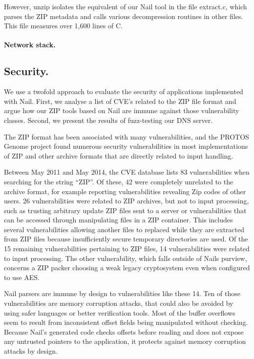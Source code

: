 However, unzip isolates the equivalent of our Nail tool in the file extract.c, which parses the ZIP
metadata and calls various decompression routines in other files. This file measures over 1,600
lines of C. 

\paragraph{Network stack.}
\subsection{Security.} 
We use a twofold approach to evaluate the security of applications implemented with Nail. First, we
analyse a list of CVE's related to the ZIP file format and argue how our ZIP tools based on Nail are
immune against those vulnerability classes. Second, we present the results of fuzz-testing our DNS
server.

The ZIP format has been associated with many vulnerabilities, and the PROTOS Genome project found numerous
security vulnerabilities in most implementations of ZIP and other archive formats that are directly
related to input handling.

Between May 2011 and May 2014, the CVE database\cite{cve-database} lists 83 vulnerabilities when searching for the
string ``ZIP''. Of these, 42 were completely unrelated to the archive format, for example reporting
vulnerabilities revealing Zip codes of other users. 26 vulnerabilities were related to ZIP archives,
but not to input processing, such as trusting arbitrary update ZIP files sent to a server or
vulnerabilities that can be accessed through manipulating files in a ZIP container. This includes
several vulnerabilities allowing another files to replaced while they are extracted from ZIP
files because insufficiently secure temporary directories are used. Of the 15 remaining
vulnerabilities pertaining to ZIP files, 14 vulnerabilities were related to input processing. The
 other vulnerability, which falls outside of Nails purview, concerns a ZIP packer choosing a weak
 legacy cryptosystem even when configured to use AES.

 Nail parsers are immune by design to vulnerabilities like these 14. Ten of those vulnerabilities
 are memory corruption attacks, that could also be avoided by using safer languages or better
 verification tools. Most of the buffer overflows seem to result from inconsistent offset fields
 being manipulated without checking. Because Nail's generated code checks offsets before reading and
 does not expose any untrusted pointers to the application, it protects against memory corruption
 attacks by design.


